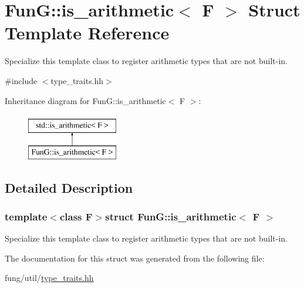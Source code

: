 \hypertarget{structFunG_1_1is__arithmetic}{\section{Fun\-G\-:\-:is\-\_\-arithmetic$<$ F $>$ Struct Template Reference}
\label{structFunG_1_1is__arithmetic}
}


Specialize this template class to register arithmetic types that are not built-\/in.  




{\ttfamily \#include $<$type\-\_\-traits.\-hh$>$}

Inheritance diagram for Fun\-G\-:\-:is\-\_\-arithmetic$<$ F $>$\-:\begin{figure}[H]
\begin{center}
\leavevmode
\includegraphics[height=2.000000cm]{structFunG_1_1is__arithmetic}
\end{center}
\end{figure}


\subsection{Detailed Description}
\subsubsection*{template$<$class F$>$struct Fun\-G\-::is\-\_\-arithmetic$<$ F $>$}

Specialize this template class to register arithmetic types that are not built-\/in. 

The documentation for this struct was generated from the following file\-:\begin{DoxyCompactItemize}
\item 
fung/util/\hyperlink{type__traits_8hh}{type\-\_\-traits.\-hh}\end{DoxyCompactItemize}
